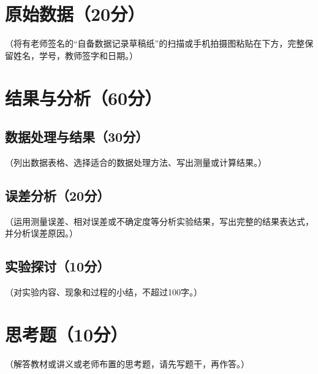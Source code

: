 \documentclass{../template/Report}
\begin{document}
\begin{fullreportonly}
    \section{原始数据（20分）}
（将有老师签名的“自备数据记录草稿纸”的扫描或手机拍摄图粘贴在下方，完整保留姓名，学号，教师签字和日期。）

\section{结果与分析（60分）}
\subsection{数据处理与结果（30分）}
（列出数据表格、选择适合的数据处理方法、写出测量或计算结果。）

\subsection{误差分析（20分）}
（运用测量误差、相对误差或不确定度等分析实验结果，写出完整的结果表达式，并分析误差原因。）

\subsection{实验探讨（10分）}
（对实验内容、现象和过程的小结，不超过100字。）

\section{思考题（10分）}
（解答教材或讲义或老师布置的思考题，请先写题干，再作答。）
\end{fullreportonly}

\insertnotes
\end{document}

